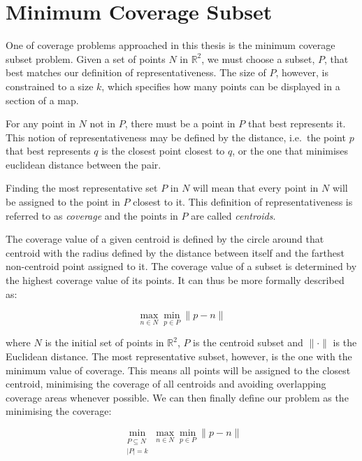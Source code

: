 \section{Minimum Coverage Subset}

One of coverage problems approached in this thesis is the minimum coverage subset problem. Given a set of points $N$ in $\mathbb{R}^2$, we must choose a subset, $P$, that best matches our definition of representativeness.
The size of $P$, however, is constrained to a size $k$, which specifies how many points can be displayed in a section of a map.

For any point in $N$ not in $P$, there must be a point in $P$ that best represents it. This notion of representativeness may be defined by the distance, i.e.\ the point $p$ that best represents $q$ is the closest point closest to $q$, or the one that minimises euclidean distance between the pair.

Finding the most representative set $P$ in $N$ will mean that every point in $N$ will be assigned to the point in $P$ closest to it. This definition of representativeness is referred to as \emph{coverage} and the points in $P$ are called \emph{centroids}.

The coverage value of a given centroid is defined by the circle around that centroid with the radius defined by the distance between itself and the farthest non-centroid point assigned to it. The coverage value of a subset is determined by the highest coverage value of its points. It can thus be more formally described as:

\begin{equation}
\max_{n \in N}
	{\min_{p \in P}
		{\lVert p-n \rVert}
	}
\end{equation}

\noindent
where $N$ is the initial set of points in $\mathbb{R}^2$, $P$ is the centroid subset and $\lVert \cdot \rVert $ is the Euclidean distance.
The most representative subset, however, is the one with the minimum value of coverage. This means all points will be assigned to the closest centroid, minimising the coverage of all centroids and avoiding overlapping coverage areas whenever possible.
We can then finally define our problem as the minimising the coverage:

\begin{equation}
\min_{\substack{P \subseteq N\\ \lvert P \rvert = k}}{\max_{n \in N}{\min_{p \in P}{\lVert p-n \rVert}}}
\end{equation}

